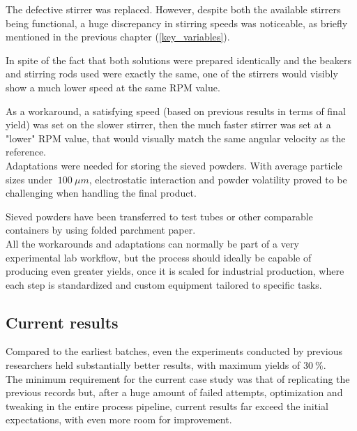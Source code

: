 \documentclass{article}
\begin{document}
        The defective stirrer was replaced. However, despite both the available stirrers being functional, a huge discrepancy 
        in stirring speeds was noticeable, as briefly mentioned in the previous chapter (\ref{key_variables}). 

        In spite of the fact that both solutions were prepared identically and the beakers and stirring rods used 
        were exactly the same, one of the stirrers would visibly show a much lower speed at the same RPM value. 

        As a workaround, a satisfying speed (based on previous results in terms of final yield) was set on the slower stirrer, 
        then the much faster stirrer was set at a "lower" RPM value, that would visually match the same angular 
        velocity as the reference. \\ 

        Adaptations were needed for storing the sieved powders. With average particle sizes under $ \ 100 \ \mu m$, 
        electrostatic interaction and powder volatility proved to be challenging when handling the final product. 
        
        Sieved powders have been transferred to test tubes or other comparable containers by using folded parchment paper. \\ 

        
        All the workarounds and adaptations can normally be part of a very experimental lab workflow, but the process should ideally 
        be capable of producing even greater yields, once it is scaled for industrial production, where each step is standardized 
        and custom equipment tailored to specific tasks. 

        \subsection{Current results\label{promising_results}}

        Compared to the earliest batches, even the experiments conducted by previous researchers held substantially better 
        results, with maximum yields of $30 \ \%$. \\ 

        The minimum requirement for the current case study was that of replicating the previous records but, after 
        a huge amount of failed attempts, optimization and tweaking in the entire process pipeline, current results 
        far exceed the initial expectations, with even more room for improvement. \\ 
\end{document}
